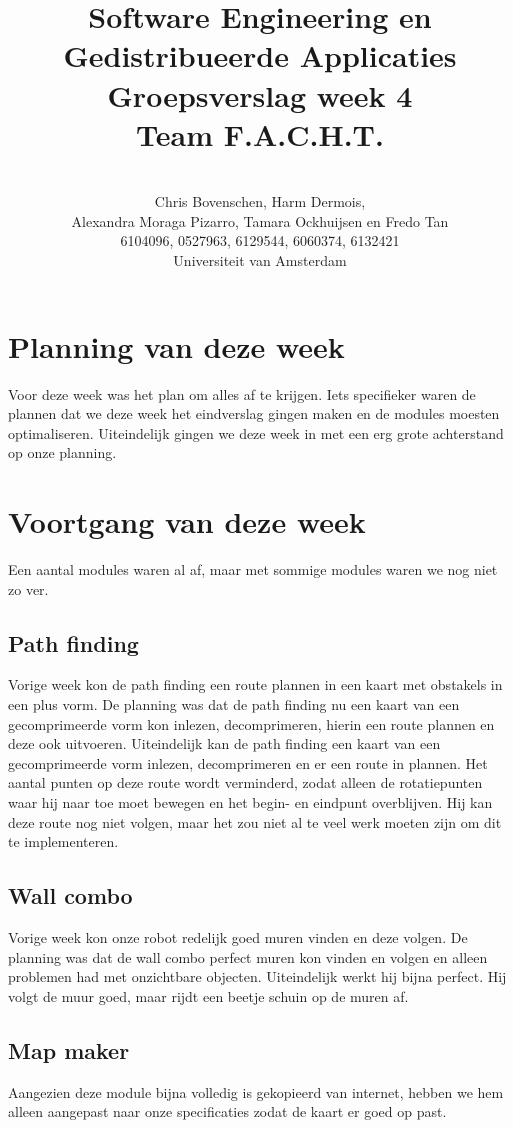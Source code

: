 \documentclass[a4paper,10pt]{article}
\title{Software Engineering en Gedistribueerde Applicaties \\[10pt]Groepsverslag week 4\\[25pt]Team F.A.C.H.T.}
\author{\\Chris Bovenschen, Harm Dermois, \\Alexandra Moraga Pizarro, Tamara Ockhuijsen en Fredo Tan \\[10pt]6104096, 0527963, 6129544, 6060374, 6132421 \\[25pt]Universiteit van Amsterdam}
\begin{document}
\maketitle
\newpage
\section{Planning van deze week}
Voor deze week was het plan om alles af te krijgen. Iets specifieker waren de plannen dat we deze week het eindverslag gingen maken en de modules moesten optimaliseren. Uiteindelijk gingen we deze week in met een erg grote achterstand op onze planning.

\section{Voortgang van deze week}
Een aantal modules waren al af, maar met sommige modules waren we nog niet zo ver.
\subsection{Path finding}
Vorige week kon de path finding een route plannen in een kaart met obstakels in een plus vorm. De planning was dat de path finding nu een kaart van een gecomprimeerde vorm kon inlezen, decomprimeren, hierin een route plannen en deze ook uitvoeren. Uiteindelijk kan de path finding een kaart van een gecomprimeerde vorm inlezen, decomprimeren en er een route in plannen. Het aantal punten op deze route wordt verminderd, zodat alleen de rotatiepunten waar hij naar toe moet bewegen en het begin- en eindpunt overblijven. Hij kan deze route nog niet volgen, maar het zou niet al te veel werk moeten zijn om dit te implementeren.

\subsection{Wall combo}
Vorige week kon onze robot redelijk goed muren vinden en deze volgen. De planning was dat de wall combo perfect muren kon vinden en volgen en alleen problemen had met onzichtbare objecten. Uiteindelijk werkt hij bijna perfect. Hij volgt de muur goed, maar rijdt een beetje schuin op de muren af.

\subsection{Map maker}
Aangezien deze module bijna volledig is gekopieerd van internet, hebben we hem alleen aangepast naar onze specificaties zodat de kaart er goed op past.
\end{document}
